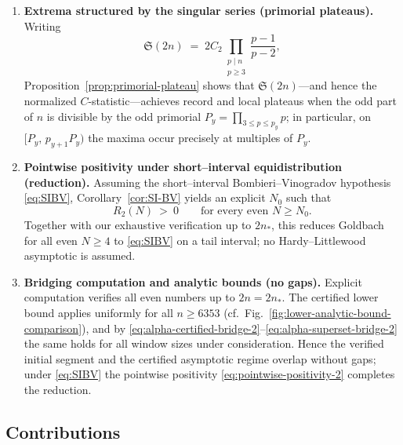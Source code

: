 \documentclass[11pt]{article}
\theoremstyle{inline}
\theoremstyle{break}
\theoremstyle{break}
\theoremstyle{break}
\theoremstyle{break}
\theoremstyle{break}
\theoremstyle{break}
\theoremstyle{break}
\theoremstyle{inline}
\newcommand{\xMertens}{6353} %
\begin{document}
\begin{enumerate}
  \item \textbf{Extrema structured by the singular series (primorial plateaus).}
  Writing
  \begin{equation}\label{eq:sing-series-bridge-2}
    \mathfrak S(2n)\;=\;2C_2\prod_{\substack{p\mid n\\ p\ge 3}}\frac{p-1}{p-2},
  \end{equation}
  Proposition~\ref{prop:primorial-plateau} shows that \( \mathfrak S(2n) \)—and hence the normalized \( C \)-statistic—achieves record and local plateaus when the odd part of \(n\) is divisible by the odd primorial \( P_y=\prod_{3\le p\le p_y}p \); in particular, on \( [P_y,\,p_{y+1}P_y) \) the maxima occur precisely at multiples of \( P_y \).

  \item \textbf{Pointwise positivity under short–interval equidistribution (reduction).}
  Assuming the short–interval Bombieri–Vinogradov hypothesis \eqref{eq:SIBV}, Corollary~\ref{cor:SI-BV} yields an explicit \( N_0 \) such that
  \begin{equation}\label{eq:pointwise-positivity-2}
    R_2(N)\ >\ 0\qquad\text{for every even }N\ge N_0.
  \end{equation}
  Together with our exhaustive verification up to \( 2n_\ast \), this reduces Goldbach for all even \( N\ge 4 \) to \eqref{eq:SIBV} on a tail interval; no Hardy–Littlewood asymptotic is assumed.

  \item \textbf{Bridging computation and analytic bounds (no gaps).}
  Explicit computation verifies all even numbers up to \(2n=2n_\ast\). The certified lower bound applies uniformly for all \( n\ge \xMertens \) (cf.\ Fig.~\ref{fig:lower-analytic-bound-comparison}), and by \eqref{eq:alpha-certified-bridge-2}–\eqref{eq:alpha-superset-bridge-2} the same holds for all window sizes under consideration. Hence the verified initial segment and the certified asymptotic regime overlap without gaps; under \eqref{eq:SIBV} the pointwise positivity \eqref{eq:pointwise-positivity-2} completes the reduction.
\end{enumerate}

\subsection*{Contributions}
\end{document}
